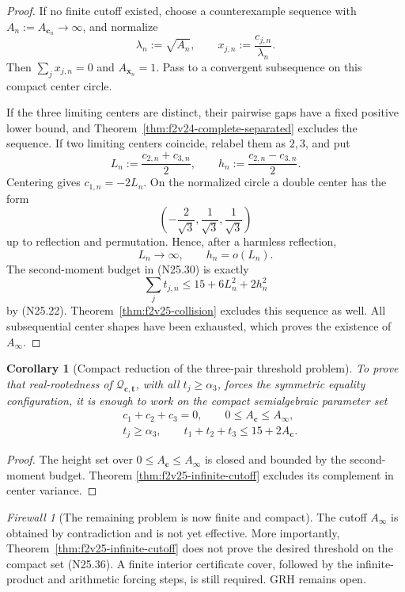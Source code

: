 \documentclass[11pt]{article}
\newtheorem{corollary}[theorem]{Corollary}
\theoremstyle{definition}
\theoremstyle{remark}
\newtheorem{firewall}[theorem]{Firewall}
\begin{document}
\begin{proof}
If no finite cutoff existed, choose a counterexample sequence with
\(A_n:=A_{\bm c_n}\to\infty\), and normalize
\[
 \lambda_n:=\sqrt{A_n},\qquad
 x_{j,n}:=\frac{c_{j,n}}{\lambda_n}.
 \tag{N25.31}
\]
Then \(\sum_jx_{j,n}=0\) and \(A_{\bm x_n}=1\).  Pass to a convergent
subsequence on this compact center circle.

If the three limiting centers are distinct, their pairwise gaps have a
fixed positive lower bound, and
Theorem~\ref{thm:f2v24-complete-separated} excludes the sequence.  If
two limiting centers coincide, relabel them as \(2,3\), and put
\[
 L_n:=\frac{c_{2,n}+c_{3,n}}2,\qquad
 h_n:=\frac{c_{2,n}-c_{3,n}}2.
 \tag{N25.32}
\]
Centering gives \(c_{1,n}=-2L_n\).  On the normalized circle a double
center has the form
\[
 \left(-\frac2{\sqrt3},\frac1{\sqrt3},\frac1{\sqrt3}\right)
 \tag{N25.33}
\]
up to reflection and permutation.  Hence, after a harmless reflection,
\[
 L_n\to\infty,\qquad h_n=o(L_n).
 \tag{N25.34}
\]
The second-moment budget in \textup{(N25.30)} is exactly
\[
 \sum_jt_{j,n}\leq15+6L_n^2+2h_n^2
 \tag{N25.35}
\]
by \textup{(N25.22)}.  Theorem~\ref{thm:f2v25-collision} excludes this
sequence as well.  All subsequential center shapes have been exhausted,
which proves the existence of \(A_\infty\).
\end{proof}

\begin{corollary}[Compact reduction of the three-pair threshold problem]
\label{cor:f2v25-compact-reduction}
To prove that real-rootedness of \(\mathcal Q_{\bm c,\bm t}\), with all
\(t_j\geq\alpha_3\), forces the symmetric equality configuration, it is
enough to work on the compact semialgebraic parameter set
\[
\begin{aligned}
 &c_1+c_2+c_3=0,\qquad 0\leq A_{\bm c}\leq A_\infty,\\
 &t_j\geq\alpha_3,\qquad
 t_1+t_2+t_3\leq15+2A_{\bm c}.
\end{aligned}
\tag{N25.36}
\]
\end{corollary}

\begin{proof}
The height set over \(0\leq A_{\bm c}\leq A_\infty\) is closed and
bounded by the second-moment budget.  Theorem
\ref{thm:f2v25-infinite-cutoff} excludes its complement in center
variance.
\end{proof}

\begin{firewall}[The remaining problem is now finite and compact]
\label{fire:f2v25}
The cutoff \(A_\infty\) is obtained by contradiction and is not yet
effective.  More importantly, Theorem~\ref{thm:f2v25-infinite-cutoff}
does not prove the desired threshold on the compact set
\textup{(N25.36)}.  A finite interior certificate cover, followed by the
infinite-product and arithmetic forcing steps, is still required.  GRH
remains open.
\end{firewall}
\end{document}
